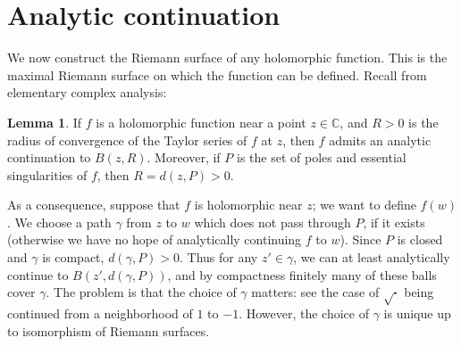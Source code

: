 \documentclass[12pt]{report}
\newcommand{\CC}{\mathbb{C}}
\theoremstyle{definition}
\newtheorem{lemma}[theorem]{Lemma}
\begin{document}
\section{Analytic continuation}
We now construct the Riemann surface of any holomorphic function. This is the maximal Riemann surface on which the function can be defined.
Recall from elementary complex analysis:
\begin{lemma}
If $f$ is a holomorphic function near a point $z \in \CC$, and $R > 0$ is the radius of convergence of the Taylor series of $f$ at $z$, then $f$ admits an analytic continuation to $B(z, R)$.
Moreover, if $P$ is the set of poles and essential singularities of $f$, then $R = d(z, P) > 0$.
\end{lemma}
As a consequence, suppose that $f$ is holomorphic near $z$; we want to define $f(w)$. We choose a path $\gamma$ from $z$ to $w$ which does not pass through $P$, if it exists (otherwise we have no hope of analytically continuing $f$ to $w$).
Since $P$ is closed and $\gamma$ is compact, $d(\gamma, P) > 0$.
Thus for any $z' \in \gamma$, we can at least analytically continue to $B(z', d(\gamma, P))$, and by compactness finitely many of these balls cover $\gamma$.
The problem is that the choice of $\gamma$ matters: see the case of $\sqrt\cdot$ being continued from a neighborhood of $1$ to $-1$.
However, the choice of $\gamma$ is unique up to isomorphism of Riemann surfaces.
\end{document}
